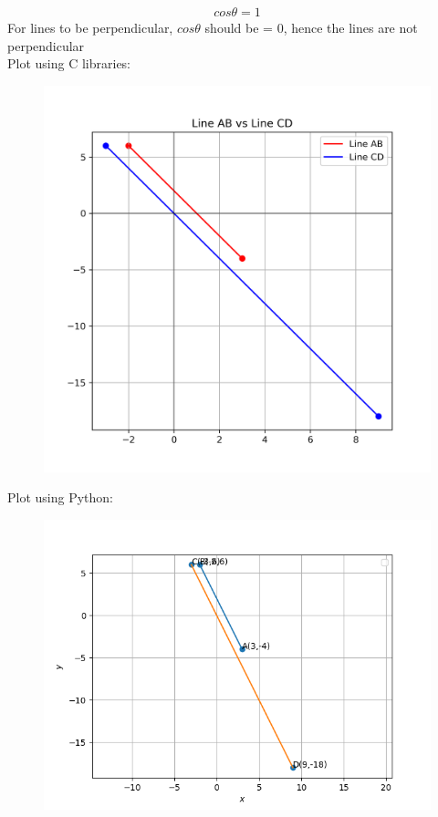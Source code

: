 \documentclass[journal,12pt,onecolumn]{IEEEtran}
\begin{document}
\begin{align}
cos\theta=1
\end{align}
For lines to be perpendicular, $cos\theta$ should be = 0, hence the lines are not perpendicular \\
Plot using C libraries:
\begin{figure}[H]
	\centering
	\includegraphics[scale=0.5]{cplot}
	\caption*{}
	\label{img1}
\end{figure}
Plot using Python:
\begin{figure}[H]
	\centering
	\includegraphics[scale=0.5]{img}
	\caption*{}
	\label{img2}
\end{figure}
\end{document}
